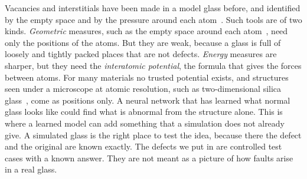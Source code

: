 \documentclass[10pt]{article}
\begin{document}
Vacancies and interstitials have been made in a model glass before, and identified by the empty space and by the pressure around each atom~\citep{laakkonen1988}. Such tools are of two kinds. \emph{Geometric} measures, such as the empty space around each atom~\citep{starr2002}, need only the positions of the atoms. But they are weak, because a glass is full of loosely and tightly packed places that are not defects. \emph{Energy} measures are sharper, but they need the \emph{interatomic potential}, the formula that gives the forces between atoms. For many materials no trusted potential exists, and structures seen under a microscope at atomic resolution, such as two-dimensional silica glass~\citep{huang2012}, come as positions only. A neural network that has learned what normal glass looks like could find what is abnormal from the structure alone. This is where a learned model can add something that a simulation does not already give. A simulated glass is the right place to test the idea, because there the defect and the original are known exactly. The defects we put in are controlled test cases with a known answer. They are not meant as a picture of how faults arise in a real glass.
\end{document}
